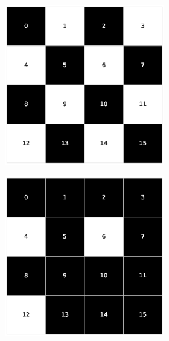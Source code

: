 \begin{figure}[h!]
\begin{subfigure}[b]{\textwidth}
\begin{subfigure}[b]{0.20\textwidth}
        \end{subfigure}
        \hspace{3em}
        \begin{subfigure}[b]{0.20\textwidth}
            \includegraphics[width=\columnwidth]{images/Tai16c_4x4_50.eps}
        \end{subfigure}
        \hspace{3em}
        \begin{subfigure}[b]{0.20\textwidth}
            \includegraphics[width=\columnwidth]{images/Tai16c_4x4_80.eps}

\end{subfigure}
\end{subfigure}
\end{figure}
